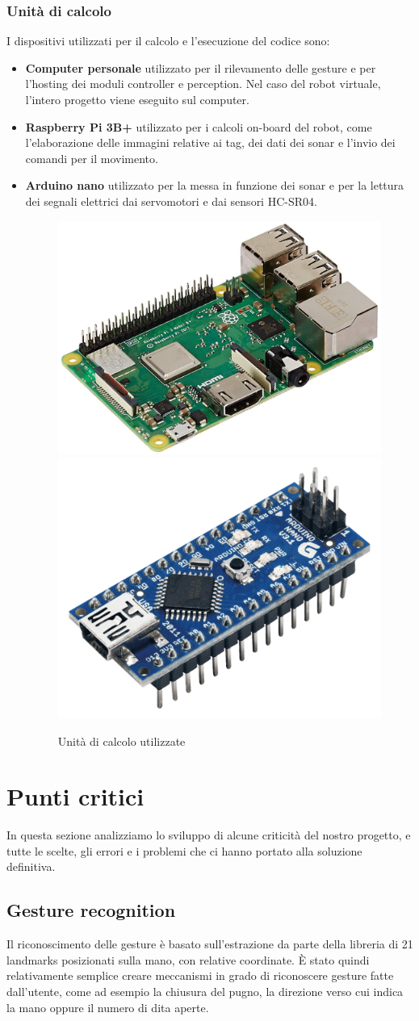 \documentclass[]{article}
\begin{document}
\subsubsection{Unità di calcolo}
I dispositivi utilizzati per il calcolo e l'esecuzione del codice sono:
\begin{itemize}
    \item \textbf{Computer personale} utilizzato per il rilevamento delle gesture e per l'hosting dei moduli controller e perception. Nel caso del robot virtuale, l'intero progetto viene eseguito sul computer.
    \item \textbf{Raspberry Pi 3B+} utilizzato per i calcoli on-board del robot, come l'elaborazione delle immagini relative ai tag, dei dati dei sonar e l'invio dei comandi per il movimento.
    \item \textbf{Arduino nano} utilizzato per la messa in funzione dei sonar e per la lettura dei segnali elettrici dai servomotori e dai sensori HC-SR04.
        \begin{figure}[H]
            \centering
            \includegraphics[width=0.3\linewidth]{immagini/rasapberry.jpg}
            \hspace*{5pt}
            \includegraphics[width=0.2\linewidth]{immagini/arduino_nanp.png}
            \caption{Unità di calcolo utilizzate}
        \end{figure}

\end{itemize}



\pagebreak
\section{Punti critici}
In questa sezione analizziamo lo sviluppo di alcune criticità del nostro progetto, e tutte le scelte, gli errori e i problemi che ci hanno portato alla soluzione definitiva.

\subsection{Gesture recognition}
Il riconoscimento delle gesture è basato sull'estrazione da parte della libreria di 21 landmarks posizionati sulla mano, con relative coordinate. È stato quindi relativamente semplice creare meccanismi in grado di riconoscere gesture fatte dall'utente, come ad esempio la chiusura del pugno, la direzione verso cui indica la mano oppure il numero di dita aperte.
\end{document}
